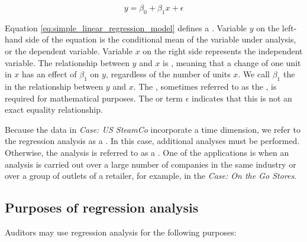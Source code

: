 \begin{equation}
  y = \beta_0 + \beta_1x + \epsilon
  \label{eq:simple_linear_regression_model}
\end{equation}

Equation \ref{eq:simple_linear_regression_model} defines a . 
Variable $y$ on the left-hand side of the equation is the conditional mean of the variable under analysis, or the dependent variable. Variable $x$ on the right side represents the independent variable. The relationship between $y$ and $x$ is , meaning that a change of one unit in $x$ has an effect of $\beta_1$ on $y$, regardless of the number of units $x$. We call  $\beta_1$ the  in the relationship between $y$ and $x$. The , sometimes referred to as the , is required for mathematical purposes. The  or  term $\epsilon$  indicates that this is not an exact equality relationship.

Because the data in \textit{Case: US SteamCo} incorporate a time dimension, we refer to the regression analysis as a . 
In this case, additional analyses must be performed. Otherwise, the analysis is referred to as a . 
One of the applications is when an analysis is carried out over a large number of companies in the same industry or over a group of outlets of a retailer, for example, in the \textit{Case: On the Go Stores}.


\subsection{Purposes of regression analysis} %
\label{sub:purposes_of_regression_analysis}

Auditors may use regression analysis for the following purposes:

